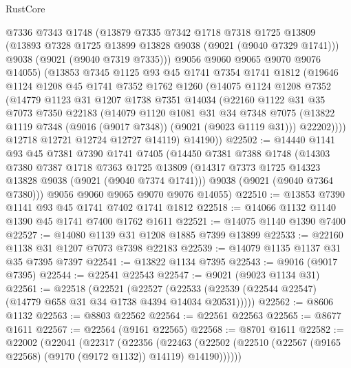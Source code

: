 \begin{lexlean}{RustCore}
\begin{coremodule}
        @7336
        @7343
        @1748
        (@13879
          @7335
          @7342
          @1718
          @7318
          @1725
          @13809
          (@13893 @7328 @1725 @13899 @13828 @9038 (@9021 (@9040 @7329 @1741)))
          @9038
          (@9021 (@9040 @7319 @7335)))
        @9056
        @9060
        @9065
        @9070
        @9076
        @14055)
      (@13853
        @7345
        @1125
        @93
        @45
        @1741
        @7354
        @1741
        @1812
        (@19646
          @1124
          @1208
          @45
          @1741
          @7352
          @1762
          @1260
          (@14075
            @1124
            @1208
            @7352
            (@14779
              @1123
              @31
              @1207
              @1738
              @7351
              @14034
              (@22160
                @1122
                @31
                @35
                @7073
                @7350
                @22183
                (@14079
                  @1120
                  @1081
                  @31
                  @34
                  @7348
                  @7075
                  (@13822 @1119 @7348 (@9016 (@9017 @7348)) (@9021 (@9023 @1119 @31)))
                  @22202))))
          @12718
          @12721
          @12724
          @12727
          @14119)
        @14190))
@22502 := @14440
    @1141
    @93
    @45
    @7381
    @7390
    @1741
    @7405
    (@14450
      @7381
      @7388
      @1748
      (@14303
        @7380
        @7387
        @1718
        @7363
        @1725
        @13809
        (@14317 @7373 @1725 @14323 @13828 @9038 (@9021 (@9040 @7374 @1741)))
        @9038
        (@9021 (@9040 @7364 @7380)))
      @9056
      @9060
      @9065
      @9070
      @9076
      @14055)
@22510 := @13853 @7390 @1141 @93 @45 @1741 @7402 @1741 @1812
@22518 := @14066 @1132 @1140 @1390 @45 @1741 @7400 @1762 @1611
@22521 := @14075 @1140 @1390 @7400
@22527 := @14080 @1139 @31 @1208 @1885 @7399 @13899
@22533 := @22160 @1138 @31 @1207 @7073 @7398 @22183
@22539 := @14079 @1135 @1137 @31 @35 @7395 @7397
@22541 := @13822 @1134 @7395
@22543 := @9016 (@9017 @7395)
@22544 := @22541 @22543
@22547 := @9021 (@9023 @1134 @31)
@22561 := @22518
    (@22521
      (@22527 (@22533 (@22539 (@22544 @22547) (@14779 @658 @31 @34 @1738 @4394 @14034 @20531)))))
@22562 := @8606 @1132
@22563 := @8803 @22562
@22564 := @22561 @22563
@22565 := @8677 @1611
@22567 := @22564 (@9161 @22565)
@22568 := @8701 @1611
@22582 := @22002
    (@22041
      (@22317
        (@22356
          (@22463 (@22502 (@22510 (@22567 (@9165 @22568) (@9170 (@9172 @1132)) @14119) @14190))))))

\end{coremodule}
\end{lexlean}
